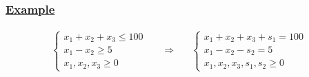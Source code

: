 \subsubsection*{\underline{Example}}

\[
\begin{array}{ccc}
\left\{
    \begin{array}{l}
         x_{1} + x_{2} + x_{3} \leq 100 \\
         x_{1} - x_{2} \geq 5 \\
         x_{1} , x_{2} , x_{3} \geq 0
    \end{array}
\right.
& \quad \Longrightarrow \quad &
\left\{
    \begin{array}{l}
         x_{1} + x_{2} + x_{3} + s_{1} = 100 \\
         x_{1} - x_{2} - s_{2} = 5 \\
         x_{1} , x_{2} , x_{3} , s_{1} , s_{2} \geq 0
    \end{array}
\right.
\end{array}
\]

